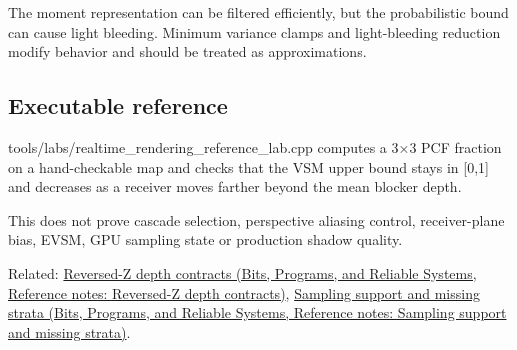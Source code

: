 The moment representation can be filtered efficiently, but the probabilistic bound can cause light bleeding. Minimum variance clamps and light-bleeding reduction modify behavior and should be treated as approximations.

\subsection{Executable reference}\label{appendix-7cac8a689849-executable-reference}

tools/labs/realtime\_rendering\_reference\_lab.cpp computes a 3×3 PCF fraction on a hand-checkable map and checks that the VSM upper bound stays in {[}0,1{]} and decreases as a receiver moves farther beyond the mean blocker depth.

This does not prove cascade selection, perspective aliasing control, receiver-plane bias, EVSM, GPU sampling state or production shadow quality.

Related: \href{../01-Bits-Programs-and-Reliable-Systems/main.pdf\#nameddest=appendix-275ec8847057}{Reversed-Z depth contracts (Bits, Programs, and Reliable Systems, Reference notes: Reversed-Z depth contracts)}, \href{../01-Bits-Programs-and-Reliable-Systems/main.pdf\#nameddest=appendix-10308c3d753e}{Sampling support and missing strata (Bits, Programs, and Reliable Systems, Reference notes: Sampling support and missing strata)}.
